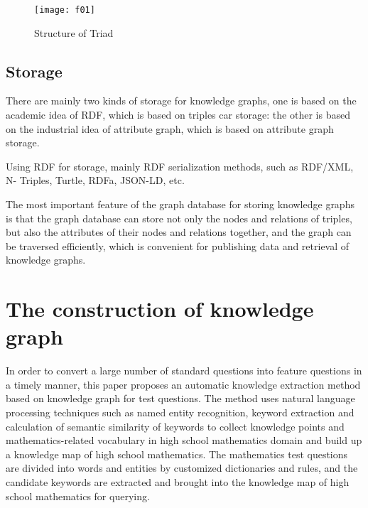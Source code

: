 \begin{figure}[h]
  \centering
  \texttt{[image: f01]}
  \caption{Structure of Triad}
  \label{triad1}
\end{figure}

\subsection{Storage}
There are mainly two kinds of storage for knowledge graphs, one is based on the academic idea of RDF, which is based on triples car storage: the other is based on the industrial idea of attribute graph, which is based on attribute graph storage.

Using RDF for storage, mainly RDF serialization methods, such as RDF/XML, N- Triples, Turtle, RDFa, JSON-LD, etc.

The most important feature of the graph database for storing knowledge graphs is that the graph database can store not only the nodes and relations of triples, but also the attributes of their nodes and relations together, and the graph can be traversed efficiently, which is convenient for publishing data and retrieval of knowledge graphs.

\section{The construction of knowledge graph}
In order to convert a large number of standard questions into feature questions in a timely manner, this paper proposes an automatic knowledge extraction method based on knowledge graph for test questions. The method uses natural language processing techniques such as named entity recognition, keyword extraction and calculation of semantic similarity of keywords to collect knowledge points and mathematics-related vocabulary in high school mathematics domain and build up a knowledge map of high school mathematics. The mathematics test questions are divided into words and entities by customized dictionaries and rules, and the candidate keywords are extracted and brought into the knowledge map of high school mathematics for querying.

